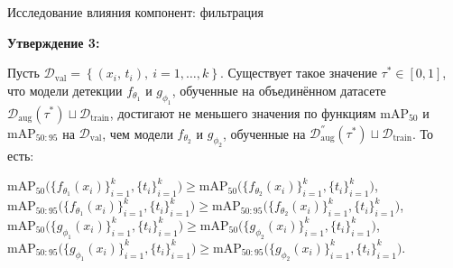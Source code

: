 \documentclass{beamer}
\begin{document}
\begin{frame}{Исследование влияния компонент: фильтрация}

\textbf{Утверждение 3:}\par
\small{
Пусть $\mathcal{D}_{\text{val}} =
\left\{
  (x_i,\,t_i), \
  i = 1,\dots,k
\right\}$. Существует такое значение $\tau^*\in[0,1]$, что модели детекции $f_{\theta_1}$ и $g_{\phi_1}$, обученные на объединённом датасете $\mathcal{D}_{\mathrm{aug}}(\tau^*)\sqcup\mathcal{D}_{\mathrm{train}}$, достигают не меньшего значения по функциям $\mathrm{mAP}_{50}$ и $\mathrm{mAP}_{50:95}$ на $\mathcal{D}_{\text{val}}$, чем модели $f_{\theta_2}$ и $g_{\phi_2}$, обученные на $\mathcal{D}^{''}_{\text{aug}}(\tau^{*}) \sqcup \mathcal{D}_{\text{train}}$. То есть:


\begin{center}
$\mathrm{mAP}_{50}\bigl(\{f_{\theta_1}(x_i)\}_{i=1}^k,\{t_i\}_{i=1}^k\bigr)\ge\mathrm{mAP}_{50}\bigl(\{f_{\theta_2}(x_i)\}_{i=1}^k,\{t_i\}_{i=1}^k\bigr)$,  
$\mathrm{mAP}_{50:95}\bigl(\{f_{\theta_1}(x_i)\}_{i=1}^k,\{t_i\}_{i=1}^k\bigr)\ge\mathrm{mAP}_{50:95}\bigl(\{f_{\theta_2}(x_i)\}_{i=1}^k,\{t_i\}_{i=1}^k\bigr)$,  
$\mathrm{mAP}_{50}\bigl(\{g_{\phi_1}(x_i)\}_{i=1}^k,\{t_i\}_{i=1}^k\bigr)\ge\mathrm{mAP}_{50}\bigl(\{g_{\phi_2}(x_i)\}_{i=1}^k,\{t_i\}_{i=1}^k\bigr)$,  
$\mathrm{mAP}_{50:95}\bigl(\{g_{\phi_1}(x_i)\}_{i=1}^k,\{t_i\}_{i=1}^k\bigr)\ge\mathrm{mAP}_{50:95}\bigl(\{g_{\phi_2}(x_i)\}_{i=1}^k,\{t_i\}_{i=1}^k\bigr)$.
\end{center}}

\end{frame}
\end{document}
